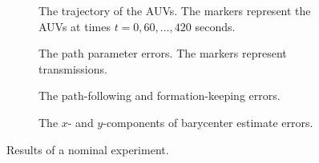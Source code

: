 \begin{figure}[p]
    \begin{minipage}{0.48\textwidth}
        \begin{subfigure}{\textwidth}
            
            \vspace{-2mm}
            \caption{The trajectory of the AUVs. The markers represent the AUVs at times $t = 0, 60, \ldots, 420$ seconds.}
            \label{fig:distr_NSB_experiment_nominal_trajectory}
        \end{subfigure}

        \vspace{-1mm}

        \begin{subfigure}{\textwidth}
            
            \vspace{-3mm}
            \caption{The path parameter errors. The markers represent transmissions.}
            \label{fig:distr_NSB_experiment_nominal_parameter}
        \end{subfigure}
    \end{minipage}
    \hspace{\fill}
    \begin{minipage}{0.48\textwidth}

        \hspace*{-1mm}
        \begin{subfigure}{\textwidth}
            \hspace*{-5mm}
            
            \vspace{-3mm}
            \caption{The path-following and formation-keeping errors.}
            \label{fig:distr_NSB_experiment_nominal_errors}
        \end{subfigure}


        \hspace*{-1mm}
        \begin{subfigure}{\textwidth}
            \hspace*{-5mm}
            
            \vspace{-3mm}
            \caption{The $x$- and $y$-components of barycenter estimate errors.}
            \label{fig:distr_NSB_experiment_nominal_barycenter}
        \end{subfigure}
    \end{minipage}

    \vspace*{-3mm}
    \caption{Results of a nominal experiment.}
    \label{fig:distr_NSB_experiment_nominal}
\end{figure}

